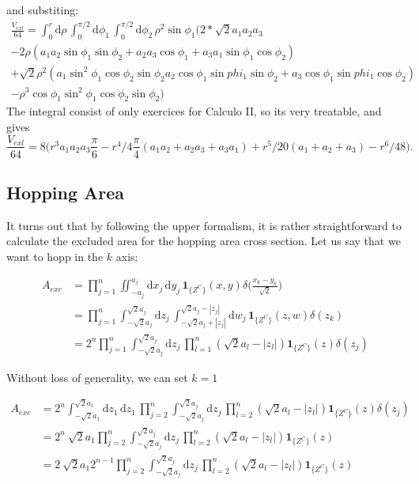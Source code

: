 \documentclass[superscriptaddress,pre,reprint,showpacs,onecolumn]{revtex4-1}
\newcommand{\rd}[1]{\mathrm{d}{#1} \,}
\newcommand{\indicatorsymbol}{\mathbf{1}}
\newcommand{\indicator}[1]{\indicatorsymbol_{ \{   #1 \} } }
\begin{document}
and substiting:
  \begin{multline}
  \frac{V_{exl}}{64}= \int_0^r \rd{\rho}
  \int_0^{\pi/2} \rd{\phi_1}   \int_0^{\pi/2} \rd{\phi_2}
  \rho^2 \sin\phi_1
  \bigg( 2*\sqrt{2} a_1 a_2 a_3 \\
  -2 \rho  ( a_1 a_2 \sin \phi_1 \sin \phi_2
  +a_2 a_3 \cos \phi_1 + a_3 a_1 \sin \phi_1 \cos \phi_2) \\
  +\sqrt{2} \rho^2( a_1 \sin^2\phi_1 \cos\phi_2 \sin\phi_2 
  a_2 \cos \phi_1 \sin phi_1 \sin\phi_2 
  + a_3 \cos \phi_1 \sin phi_1 \cos \phi_2 ) \\
  -\rho^3  \cos\phi_1 \sin^2\phi_1 \cos\phi_2 \sin\phi_2 
  \bigg)
   \end{multline}
The integral consist of only exercices for Calculo II, so its very treatable, and gives
\begin{equation}
  \frac{V_{exl}}{64}= 8 \bigg(
   r^3 a_1 a_2 a_3 \frac{\pi}{6}
  - r^4/4 \frac{\pi}{4} (a_1 a_2 +a_2 a_3 + a_3 a_1)
  +  r^5/20 (a_1 + a_2 + a_3)
  -  r^6/48 \bigg).
\end{equation}

\subsection{Hopping Area}

It turns out that by following the upper formalism, it is rather
straightforward to calculate the excluded area for the hopping area
cross section. Let us say that we want to hopp in the $k$ axis:

\begin{equation}
  \begin{split}
    A_{exc} 
   &  =  \prod_{j=1}^n \iint_{-a_j}^{a_j} \rd{x_j} \rd{y_j} \indicator{Z^C} (x,y)
    \delta \big(\frac{x_k-y_k}{\sqrt{2}}\big) \\
    &  =  \prod_{j=1}^n \int_{-\sqrt{2} a_j}^{\sqrt{2}a_j} \rd{z_j}
\int_{-\sqrt{2} a_j+|z_j|}^{\sqrt{2}a_j-|z_j|} \rd{w_j}
 \indicator{Z^C} (z,w)
    \delta (z_k) \\
        &  = 2^n \prod_{j=1}^n \int_{-\sqrt{2} a_j}^{\sqrt{2}a_j} \rd{z_j}
 \prod_{l=1}^n (\sqrt{2}a_l-|z_l|)
 \indicator{Z^C} (z)
    \delta (z_j) 
  \end{split}
\end{equation}

Without loss of generality, we can set $k=1$

\begin{equation}
  \begin{split}
    A_{exc} &=  2^n \int_{-\sqrt{2}a_1}^{\sqrt{2}a_1} \rd{z_1} \rd{z_1}
    \prod_{j=2}^n \int_{-\sqrt{2} a_j}^{\sqrt{2}a_j} \rd{z_j}
    \prod_{l=2}^n (\sqrt{2}a_l-|z_l|)
    \indicator{Z^C} (z)
    \delta (z_j) \\
    &= 2^n\ \sqrt{2}a_1    \prod_{j=2}^n \int_{-\sqrt{2} a_j}^{\sqrt{2}a_j} \rd{z_j}
    \prod_{l=2}^n (\sqrt{2}a_l-|z_l|)
    \indicator{Z^C} (z) \\
    &= 2\ \sqrt{2}a_1  2^{n-1}  \prod_{j=2}^n \int_{-\sqrt{2} a_j}^{\sqrt{2}a_j} \rd{z_j}
     \prod_{l=2}^n (\sqrt{2}a_l-|z_l|)
    \indicator{Z^C} (z) 
  \end{split}
\end{equation}
\end{document}
